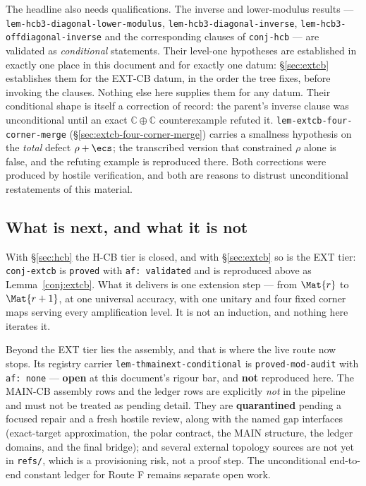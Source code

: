 The headline also needs qualifications. The inverse and lower-modulus results
--- \texttt{lem-hcb3-diagonal-lower-modulus}, \texttt{lem-hcb3-diagonal-inverse},
\texttt{lem-hcb3-offdiagonal-inverse} and the corresponding clauses of
\texttt{conj-hcb} --- are validated as \emph{conditional} statements. Their level-one
hypotheses are established in exactly one place in this document and for exactly one
datum: \S\ref{sec:extcb} establishes them for the EXT-CB datum, in the order the tree
fixes, before invoking the clauses. Nothing else here supplies them for any datum. Their
conditional shape is itself a correction of record: the parent's inverse clause was
unconditional until an exact $\mathbb C\oplus\mathbb C$ counterexample refuted it.
\texttt{lem-extcb-four-corner-merge} (\S\ref{sec:extcb-four-corner-merge}) carries
a smallness hypothesis on the \emph{total} defect $\rho+\ecs$; the transcribed version
that constrained $\rho$ alone is false, and the refuting example is
reproduced there. Both corrections were produced by hostile verification, and both are
reasons to distrust unconditional restatements of this material.

\subsection*{What is next, and what it is not}

With \S\ref{sec:hcb} the H-CB tier is closed, and with \S\ref{sec:extcb} so is the EXT
tier: \texttt{conj-extcb} is \texttt{proved} with \texttt{af: validated} and is reproduced
above as Lemma~\ref{conj:extcb}. What it delivers is one extension step --- from
$\Mat{r}$ to $\Mat{r+1}$, at one universal accuracy, with one unitary and four fixed
corner maps serving every amplification level. It is not an induction, and nothing here
iterates it.

Beyond the EXT tier lies the assembly, and that is where the live route now stops.
Its registry carrier \texttt{lem-thmainext-conditional} is \texttt{proved-mod-audit} with
\texttt{af: none} --- \textbf{open} at this document's rigour bar, and \textbf{not}
reproduced here. The MAIN-CB assembly rows and the ledger rows are
explicitly \emph{not} in the pipeline and must not be treated as pending detail. They
are \textbf{quarantined} pending a focused repair and a fresh hostile review, along with
the named gap interfaces (exact-target approximation, the polar contract, the MAIN
structure, the ledger domains, and the final bridge); and several external
topology sources are not yet in \texttt{refs/}, which is a provisioning risk, not a proof
step. The unconditional end-to-end constant ledger for Route F remains separate open work.

